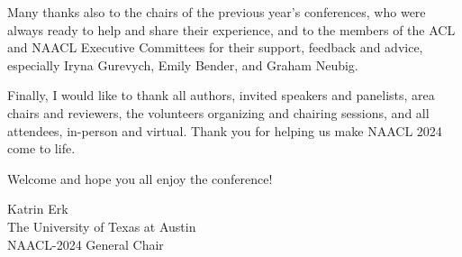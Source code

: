 Many thanks also to the chairs of the previous year's conferences, who were always ready to help and share their experience, and to the members of the ACL and NAACL Executive Committees for their support, feedback and advice, especially Iryna Gurevych, Emily Bender, and Graham Neubig. 

Finally, I would like to thank all authors, invited speakers and panelists, area chairs and reviewers, the volunteers organizing and chairing sessions, and all attendees, in-person and virtual. Thank you for helping us make NAACL 2024 come to life.

Welcome and hope you all enjoy the conference!

\vspace{1em}

Katrin Erk\\
The University of Texas at Austin\\
NAACL-2024 General Chair
